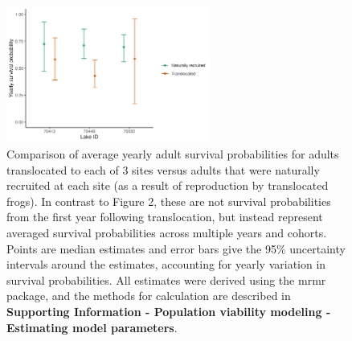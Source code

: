 \documentclass[9pt,twoside,lineno]{pnas-new-SI}
\begin{document}
\begin{figure}

{\centering \includegraphics[width=0.60\textwidth]{figures/compare_surv_probs.jpg}

}

\caption{\label{fig-compare_surv_probs}Comparison of average yearly
adult survival probabilities for adults translocated to each of 3 sites
versus adults that were naturally recruited at each site (as a result of
reproduction by translocated frogs). In contrast to
Figure 2, these are not survival
probabilities from the first year following translocation, but instead
represent averaged survival probabilities across multiple years and
cohorts. Points are median estimates and error bars give the 95\%
uncertainty intervals around the estimates, accounting for yearly
variation in survival probabilities. All estimates were derived using
the mrmr package, and the methods for calculation are described in
\textbf{Supporting Information - Population viability modeling -
Estimating model parameters}.}

\end{figure}\clearpage

\newpage
\end{document}
